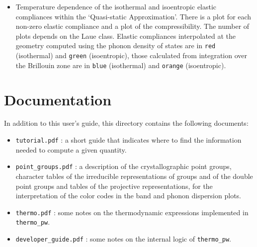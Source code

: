 \documentclass[12pt,a4paper]{article}
\begin{document}
\begin{itemize}
\item
Temperature dependence of the isothermal and isoentropic elastic compliances
within the 
`Quasi-static Approximation'. There is a plot for each non-zero
elastic compliance and a plot of the compressibility. The number of plots 
depends on the Laue class. 
Elastic compliances
interpolated at the geometry computed using the phonon density of states 
are in \texttt{red} (isothermal) and \texttt{green} (isoentropic), 
those calculated from integration over the 
Brillouin zone are in \texttt{blue} (isothermal) and \texttt{orange} 
(isoentropic).

\end{itemize}

\newpage
\section{\color{coral}Documentation}

In addition to this user's guide, this directory contains the following
documents:

\begin{itemize}

\item
\texttt{tutorial.pdf} : a short guide that indicates where to find the
information needed to compute a given quantity. 

\item
\texttt{point\_groups.pdf} : a description of the crystallographic point 
groups, character tables of the irreducible representations of groups and 
of the double point groups and tables of the projective representations, 
for the interpretation of the color codes in the band and phonon dispersion 
plots.

\item
\texttt{thermo.pdf} : some notes on the thermodynamic expressions implemented
in \texttt{thermo\_pw}.

\item
\texttt{developer\_guide.pdf} : some notes on the internal logic of
\texttt{thermo\_pw}.

\end{itemize}
\end{document}
